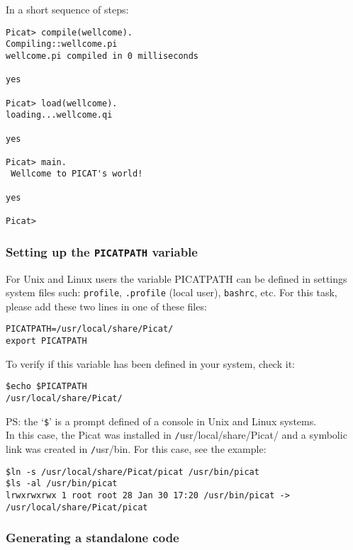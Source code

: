 \begin{description}
In a short sequence of steps:

\begin{verbatim}
Picat> compile(wellcome).
Compiling::wellcome.pi
wellcome.pi compiled in 0 milliseconds

yes

Picat> load(wellcome).   
loading...wellcome.qi

yes

Picat> main.
 Wellcome to PICAT's world! 
 
yes

Picat> 
\end{verbatim}

\end{description}



\subsubsection{Setting up the  \texttt{PICATPATH} variable}

For Unix and Linux users the variable PICATPATH 
can be defined in settings system files such:
\texttt{profile}, \texttt{.profile} (local user), \texttt{bashrc}, etc.
For this task, please add these two lines in one of these files:

\begin{verbatim}
PICATPATH=/usr/local/share/Picat/
export PICATPATH
\end{verbatim}

To verify if this variable has been defined
in your system, check it:

\begin{verbatim}
$echo $PICATPATH
/usr/local/share/Picat/
\end{verbatim}

PS: the\/ `{\texttt \$}' is a prompt defined of a console in Unix and Linux systems.\\

In this case, the Picat was installed in {\texttt /usr/local/share/Picat/} and a symbolic link
was created in {\texttt /usr/bin}. For this case, see the example:

\begin{verbatim}
$ln -s /usr/local/share/Picat/picat /usr/bin/picat
$ls -al /usr/bin/picat 
lrwxrwxrwx 1 root root 28 Jan 30 17:20 /usr/bin/picat -> /usr/local/share/Picat/picat
\end{verbatim}


\subsubsection{Generating a standalone code}

